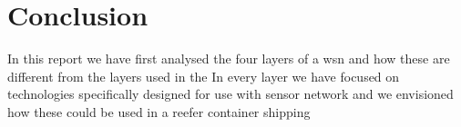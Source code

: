 \section{Conclusion}\label{sec:conclusion}

In this report we have first analysed the four layers of a \acrlong{wsn} and how these are different from the layers used in the  In every layer we have focused on technologies specifically designed for use with sensor network and we envisioned how these could be used in a reefer container shipping 